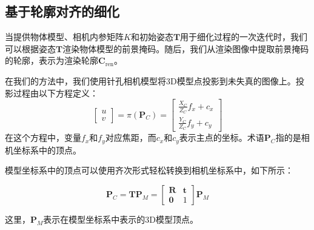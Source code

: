 \subsection{基于轮廓对齐的细化}

当提供物体模型、相机内参矩阵$K$和初始姿态$\mathbf{T}$用于细化过程的一次迭代时，我们可以根据姿态$\mathbf{T}$渲染物体模型的前景掩码。随后，我们从渲染图像中提取前景掩码的轮廓，表示为渲染轮廓$\mathbf{C}_\text{ren}$。

在我们的方法中，我们使用针孔相机模型将3D模型点投影到未失真的图像上。投影过程由以下方程定义：
\begin{equation}
\begin{bmatrix}u\\v\end{bmatrix} = \pi(\mathbf{P}_C) = \begin{bmatrix}\frac{X_C}{Z_C} f_x+c_x\\[3pt] \frac{Y_C}{Z_C} f_y+c_y\end{bmatrix}
\label{eq:camera}
\end{equation}
在这个方程中，变量$f_x$和$f_y$对应焦距，而$c_x$和$c_y$表示主点的坐标。术语$\mathbf{P}_C$指的是相机坐标系中的顶点。

模型坐标系中的顶点可以使用齐次形式轻松转换到相机坐标系中，如下所示：

\begin{equation}
\mathbf{P}_C = \mathbf{T}\mathbf{P}_M=
\begin{bmatrix}
    \mathbf{R}&\mathbf{t}\\
    \mathbf{0} & 1
\end{bmatrix}
\mathbf{P}_M
\end{equation}

这里，$\mathbf{P}_M$表示在模型坐标系中表示的3D模型顶点。

